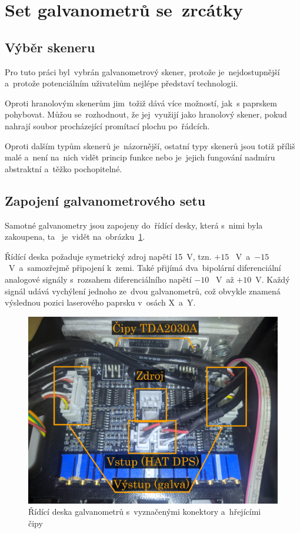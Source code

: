 \section{Set galvanometrů se~zrcátky} \label{sec:my-galvos}
\subsection{Výběr skeneru}
Pro tuto práci byl~vybrán galvanometrový skener, protože je~nejdostupnější a~protože potenciálním uživatelům nejlépe představí technologii.

Oproti hranolovým skenerům jim~tožiž dává více možností, jak~s paprskem pohybovat.
Můžou se~rozhodnout, že jej~využijí jako hranolový skener, pokud nahrají soubor procházející promítací plochu po~řádcích.

Oproti dalším typům skenerů je~názornější, ostatní typy skenerů jsou totiž příliš malé a~není na~nich vidět princip funkce nebo je~jejich fungování nadmíru abstraktní a~těžko pochopitelné.

\subsection{Zapojení galvanometrového setu}
Samotné galvanometry jsou zapojeny do~řídící desky, která s~nimi byla zakoupena, ta ~je~vidět na~obrázku~\ref{fig:hw_galvoboard}.

Řídící deska požaduje symetrický zdroj napětí 15~V, tzn. $+15$ ~V~a~$-15$ ~V~a~samozřejmě připojení k~zemi. Také přijímá dva~bipolární diferenciální analogové signály s~rozsahem diferenciálního napětí $-10$ ~V~až $+10$~V. Každý signál udává vychýlení jednoho ze~dvou galvanometrů, což obvykle znamená výslednou pozici laserového paprsku v~osách X~a~Y.

\begin{figure}[htb]
  \centering
  \includegraphics[width=1\textwidth]{img/hw_galvoboard.jpg}
  \caption{\label{fig:hw_galvoboard} Řídící deska galvanometrů s~vyznačenými konektory a~hřejícími čipy}
\end{figure}

